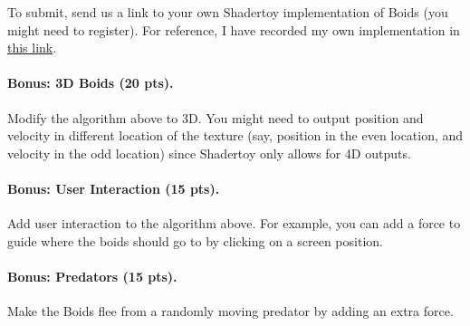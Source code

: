 To submit, send us a link to your own Shadertoy implementation of Boids (you might need to register). For reference, I have recorded my own implementation in \href{https://cseweb.ucsd.edu/~tzli/cse167/boids.webm}{this link}.

\paragraph{Bonus: 3D Boids (20 pts).} Modify the algorithm above to 3D. You might need to output position and velocity in different location of the texture (say, position in the even location, and velocity in the odd location) since Shadertoy only allows for 4D outputs.

\paragraph{Bonus: User Interaction (15 pts).} Add user interaction to the algorithm above. For example, you can add a force to guide where the boids should go to by clicking on a screen position.

\paragraph{Bonus: Predators (15 pts).} Make the Boids flee from a randomly moving predator by adding an extra force. 


